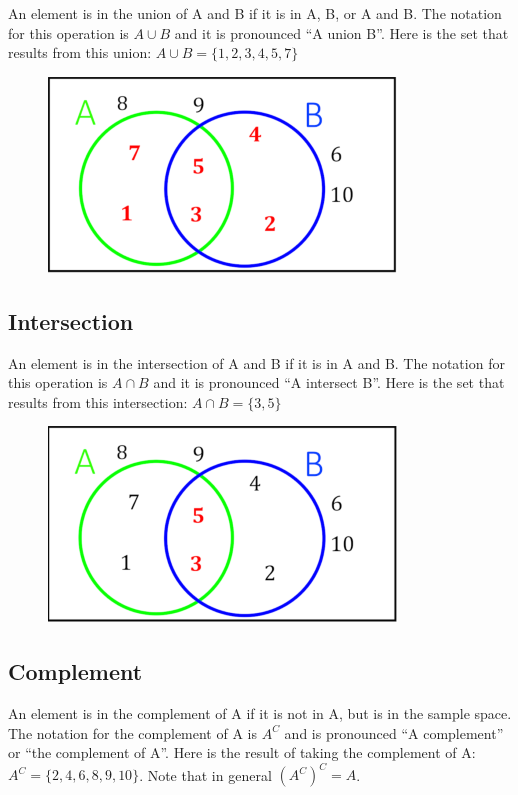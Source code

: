 \documentclass[]{book}
\begin{document}
An element is in the union of A and B if it is in A, B, or A and B. The
notation for this operation is \(A \cup B\) and it is pronounced ``A
union B''. Here is the set that results from this union:
\(A \cup B = \{1,2,3,4,5,7\}\)

\begin{figure}
\centering
\includegraphics{Pictures/01-Sets/AUB.PNG}
\caption{}
\end{figure}

\subsection{Intersection}\label{intersection}

An element is in the intersection of A and B if it is in A and B. The
notation for this operation is \(A \cap B\) and it is pronounced ``A
intersect B''. Here is the set that results from this intersection:
\(A \cap B = \{3,5\}\)

\begin{figure}
\centering
\includegraphics{Pictures/01-Sets/AcapB.PNG}
\caption{}
\end{figure}

\subsection{Complement}\label{complement}

An element is in the complement of A if it is not in A, but is in the
sample space. The notation for the complement of A is \(A^C\) and is
pronounced ``A complement'' or ``the complement of A''. Here is the
result of taking the complement of A: \(A^C = \{2,4,6,8,9,10\}\). Note
that in general \((A^C)^C = A\).
\end{document}
